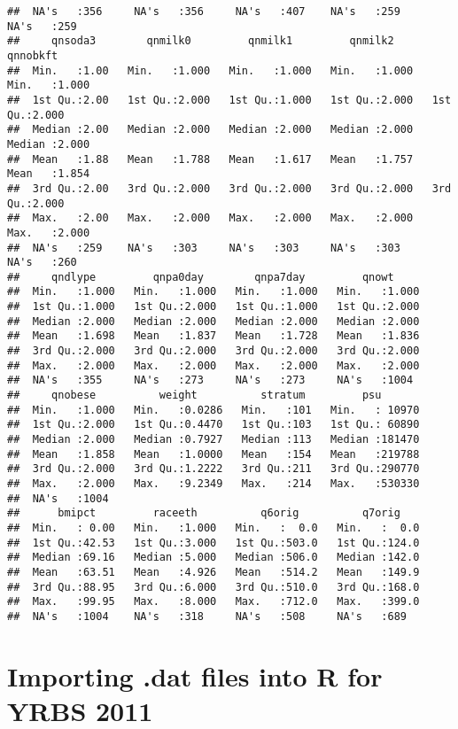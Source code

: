 \documentclass[
]{article}
\begin{document}
\begin{verbatim}
##  NA's   :356     NA's   :356     NA's   :407    NA's   :259     NA's   :259    
##     qnsoda3        qnmilk0         qnmilk1         qnmilk2         qnnobkft    
##  Min.   :1.00   Min.   :1.000   Min.   :1.000   Min.   :1.000   Min.   :1.000  
##  1st Qu.:2.00   1st Qu.:2.000   1st Qu.:1.000   1st Qu.:2.000   1st Qu.:2.000  
##  Median :2.00   Median :2.000   Median :2.000   Median :2.000   Median :2.000  
##  Mean   :1.88   Mean   :1.788   Mean   :1.617   Mean   :1.757   Mean   :1.854  
##  3rd Qu.:2.00   3rd Qu.:2.000   3rd Qu.:2.000   3rd Qu.:2.000   3rd Qu.:2.000  
##  Max.   :2.00   Max.   :2.000   Max.   :2.000   Max.   :2.000   Max.   :2.000  
##  NA's   :259    NA's   :303     NA's   :303     NA's   :303     NA's   :260    
##     qndlype         qnpa0day        qnpa7day         qnowt      
##  Min.   :1.000   Min.   :1.000   Min.   :1.000   Min.   :1.000  
##  1st Qu.:1.000   1st Qu.:2.000   1st Qu.:1.000   1st Qu.:2.000  
##  Median :2.000   Median :2.000   Median :2.000   Median :2.000  
##  Mean   :1.698   Mean   :1.837   Mean   :1.728   Mean   :1.836  
##  3rd Qu.:2.000   3rd Qu.:2.000   3rd Qu.:2.000   3rd Qu.:2.000  
##  Max.   :2.000   Max.   :2.000   Max.   :2.000   Max.   :2.000  
##  NA's   :355     NA's   :273     NA's   :273     NA's   :1004   
##     qnobese          weight          stratum         psu        
##  Min.   :1.000   Min.   :0.0286   Min.   :101   Min.   : 10970  
##  1st Qu.:2.000   1st Qu.:0.4470   1st Qu.:103   1st Qu.: 60890  
##  Median :2.000   Median :0.7927   Median :113   Median :181470  
##  Mean   :1.858   Mean   :1.0000   Mean   :154   Mean   :219788  
##  3rd Qu.:2.000   3rd Qu.:1.2222   3rd Qu.:211   3rd Qu.:290770  
##  Max.   :2.000   Max.   :9.2349   Max.   :214   Max.   :530330  
##  NA's   :1004                                                   
##      bmipct         raceeth          q6orig          q7orig     
##  Min.   : 0.00   Min.   :1.000   Min.   :  0.0   Min.   :  0.0  
##  1st Qu.:42.53   1st Qu.:3.000   1st Qu.:503.0   1st Qu.:124.0  
##  Median :69.16   Median :5.000   Median :506.0   Median :142.0  
##  Mean   :63.51   Mean   :4.926   Mean   :514.2   Mean   :149.9  
##  3rd Qu.:88.95   3rd Qu.:6.000   3rd Qu.:510.0   3rd Qu.:168.0  
##  Max.   :99.95   Max.   :8.000   Max.   :712.0   Max.   :399.0  
##  NA's   :1004    NA's   :318     NA's   :508     NA's   :689
\end{verbatim}

\hypertarget{importing-.dat-files-into-r-for-yrbs-2011}{%
\section{Importing .dat files into R for YRBS
2011}\label{importing-.dat-files-into-r-for-yrbs-2011}}
\end{document}
